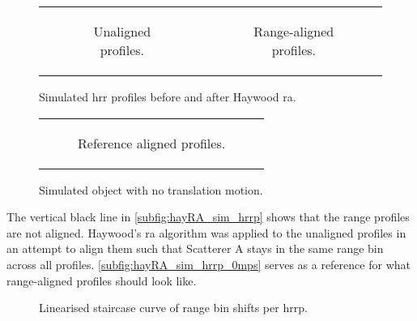 \documentclass[class=report,11pt,crop=false]{standalone}
\begin{document}
    \begin{figure}[h]
    \begin{minipage}{0.6\linewidth}
        \begin{tabular}{@{}cc@{}}
            \begin{subfigure}{0.5\linewidth}
                \centering
                \resizebox{\linewidth}{!}{}
                \caption{Unaligned profiles.\label{subfig:sim_hrrp_1mps}}
            \end{subfigure}
            &
            \begin{subfigure}{0.5\linewidth}
                \centering
                \resizebox{\linewidth}{!}{}
                \caption{Range-aligned profiles.\label{subfig:hayRA_sim_hrrp}}
            \end{subfigure}
        \end{tabular}
        \caption{Simulated \gls{hrr} profiles before and after Haywood \gls{ra}. \label{subfig:hayRA_sim}}
    \end{minipage}
    \hfill
    \begin{minipage}{0.3\linewidth}
        \begin{tabular}{@{}c@{}}
            \begin{subfigure}{\linewidth}
                \centering
                \resizebox{\linewidth}{!}{}
                \caption{Reference aligned profiles.\label{subfig:hayRA_sim_hrrp_0mps}}
            
            \end{subfigure}
        \end{tabular}
        \caption{Simulated object with no translation motion. \label{fig:sim_0mps}}
    \end{minipage}
    \end{figure}

    The vertical black line in \autoref{subfig:hayRA_sim_hrrp} shows that the range profiles are not aligned. Haywood's \gls{ra} algorithm was applied to the unaligned profiles in an attempt to align them such that Scatterer A stays in the same range bin across all profiles. \autoref{subfig:hayRA_sim_hrrp_0mps} serves as a reference for what range-aligned profiles should look like.

    \begin{figure}
        \centering
        \resizebox{0.45\linewidth}{!}{}
        \caption{Linearised staircase curve of range bin shifts per \gls{hrrp}.\label{fig:hayRA_sim_shifts}}
    \end{figure}
\end{document}
